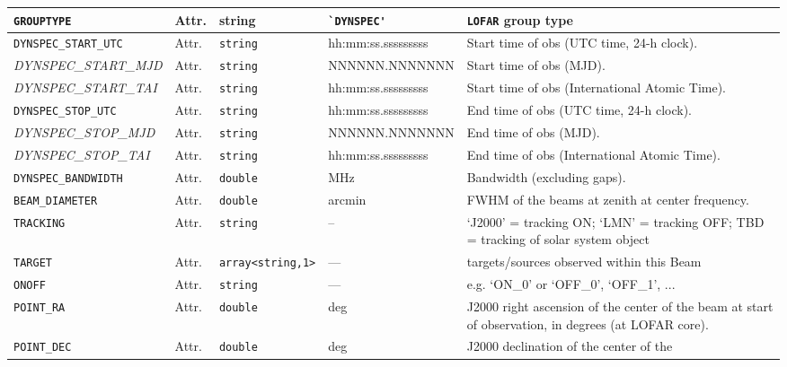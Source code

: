 \documentclass[a4paper,10pt,bibtotoc]{scrartcl}
\begin{document}
\begin{supertabular}{|p{3.5cm}p{1cm}p{2.5cm}p{3.5cm}p{5cm}|}
  \small{\verb|GROUPTYPE|}              & Attr. & string & \verb|`DYNSPEC'| & \small{\texttt{LOFAR}} group type \\
    \hline
  \small{\verb|DYNSPEC_START_UTC|} & Attr. & \verb|string| & hh:mm:ss.sssssssss & Start time of obs (UTC time, 24-h clock). \\
  \scriptsize{\textit{DYNSPEC\_START\_MJD}} & Attr. & \verb|string| & \small{NNNNNN.NNNNNNN} & Start time of obs (MJD). \\
  \scriptsize{\textit{DYNSPEC\_START\_TAI}} & Attr. & \verb|string| & hh:mm:ss.sssssssss & Start time of obs (International Atomic Time). \\
  \small{\verb|DYNSPEC_STOP_UTC|} & Attr. & \verb|string| & hh:mm:ss.sssssssss & End time of obs (UTC time, 24-h clock). \\
  \scriptsize{\textit{DYNSPEC\_STOP\_MJD}}  & Attr. & \verb|string| & \small{NNNNNN.NNNNNNN} & End time of obs (MJD).  \\
  \scriptsize{\textit{DYNSPEC\_STOP\_TAI}} & Attr. & \verb|string| & hh:mm:ss.sssssssss & End time of obs (International Atomic Time). \\
  \small{\verb|DYNSPEC_BANDWIDTH|} & Attr. & \verb|double| & MHz & Bandwidth (excluding gaps). \\
  \small{\verb|BEAM_DIAMETER|} & Attr. & \verb|double| & arcmin & FWHM of the beams at zenith at center frequency. \\
  \small{\verb|TRACKING|} & Attr. & \verb|string| & -- & `J2000' = tracking ON; `LMN' = tracking OFF; TBD = tracking
    of solar system object \\
  \small{\verb|TARGET|} & Attr.   & \verb|array<string,1>| & --- & targets/sources observed within this Beam \\
  \small{\verb|ONOFF|} & Attr.   & \verb|string| & --- & e.g. `ON\_0' or `OFF\_0', `OFF\_1', ... \\
  \small{\verb|POINT_RA|} & Attr. & \verb|double| & deg & J2000 right ascension of the center of
  the beam at start of observation, in degrees (at LOFAR core). \\
  \small{\verb|POINT_DEC|} & Attr. & \verb|double| & deg &  J2000 declination of the center of the

\end{supertabular}
\end{document}
